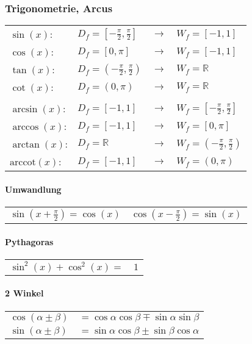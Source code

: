 \subsubsection{Trigonometrie, Arcus}
    \begin{tabular}{llll}
        $\sin(x)$: & $D_f=[-\frac{\pi}{2},\frac{\pi}{2}]$ & $\rightarrow$ &  $W_f=[-1,1]$ \\
        $\cos(x)$: & $D_f=[0,\pi]$ & $\rightarrow$ &  $W_f=[-1,1]$  \\
        $\tan(x)$: & $D_f=(-\frac{\pi}{2},\frac{\pi}{2})$ & $\rightarrow$ & $W_f=\mathbb{R}$\\
        $\cot(x)$: & $D_f=(0,\pi)$ & $\rightarrow$ &  $W_f=\mathbb{R}$ \\
        \\
        $\arcsin(x)$: & $D_f=[-1,1] $ & $\rightarrow$ & $ W_f=[-\frac{\pi}{2},\frac{\pi}{2}]$ \\
        $\arccos(x)$: & $D_f=[-1,1]$ & $\rightarrow$ &  $W_f=[0,\pi]$ \\
        $\arctan(x)$: & $D_f=\mathbb{R}$ & $\rightarrow$ &  $W_f=(-\frac{\pi}{2},\frac{\pi}{2})$ \\
        $\mathrm{arccot}(x)$: & $D_f=[-1,1]$ & $\rightarrow$ &  $W_f=(0,\pi)$ \\		
    \end{tabular}

    \paragraph{Umwandlung}
        \begin{tabular}{ll}
            $\sin(x + \frac{\pi}{2}) = \cos(x)$ & $\cos(x - \frac{\pi}{2}) = \sin(x)$ \\	
        \end{tabular}

    \paragraph{Pythagoras}
        \begin{tabular}{ll}
            $\sin^2(x) + \cos^2(x) =$ & $ 1 $ \\
        \end{tabular}

    \paragraph{2 Winkel}
        \begin{tabular}{ll}
            $\cos(\alpha \pm \beta)$ & $= \cos\alpha\cos\beta \mp \sin\alpha\sin\beta$ \\
            $\sin(\alpha \pm \beta)$ & $= \sin\alpha\cos\beta \pm \sin\beta\cos\alpha$ \\
        \end{tabular}

